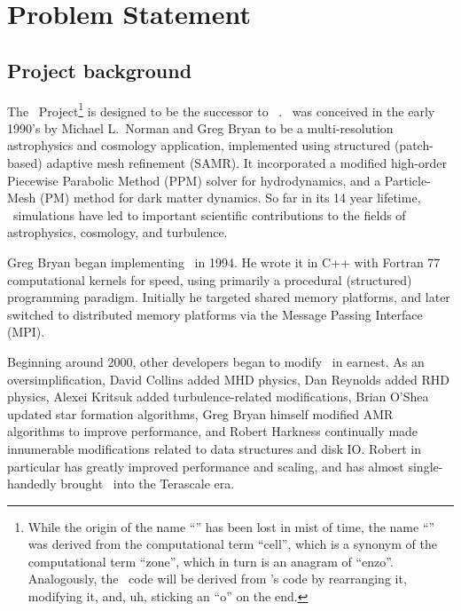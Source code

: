 \documentclass[11pt]{article}
\begin{document}

\section{Problem Statement}

\subsection{Project background}


    The \cello\ Project\footnote{While the origin of the name
    ``\enzo'' has been lost in mist of time, the name ``\cello'' was
    derived from the computational term ``cell'', which is a synonym
    of the computational term ``zone'', which in turn is an anagram of
    ``enzo''.  Analogously, the \cello\ code will be derived from
    \enzo's code by rearranging it, modifying it, and, uh, sticking an
    ``o'' on the end.}  is designed to be the successor to
    \enzo~\cite{@@@}.  \enzo\ was conceived in the early 1990's by
    Michael L.~Norman and Greg Bryan to be a multi-resolution
    astrophysics and cosmology application, implemented using
    structured (patch-based) adaptive mesh refinement (SAMR).  It
    incorporated a modified high-order Piecewise Parabolic Method
    (PPM) solver for hydrodynamics, and a Particle-Mesh (PM) method
    for dark matter dynamics.  So far in its 14 year lifetime, \enzo\
    simulations have led to important scientific contributions to the
    fields of astrophysics, cosmology, and turbulence.

    Greg Bryan began implementing \enzo\ in 1994.  He wrote it in C++
    with Fortran 77 computational kernels for speed, using primarily a
    procedural (structured) programming paradigm.  Initially he
    targeted shared memory platforms, and later switched to
    distributed memory platforms via the Message Passing Interface
    (MPI).

    Beginning around 2000, other developers began to modify \enzo\ in
    earnest. As an oversimplification, David Collins added MHD
    physics, Dan Reynolds added RHD physics, Alexei Kritsuk added
    turbulence-related modifications, Brian O'Shea updated star
    formation algorithms, Greg Bryan himself modified AMR algorithms
    to improve performance, and Robert Harkness continually made
    innumerable modifications related to data structures and disk IO.
    Robert in particular has greatly improved performance and scaling,
    and has almost single-handedly brought \enzo\ into the Terascale
    era.
\end{document}
